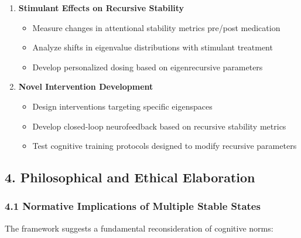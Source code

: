 \documentclass[
]{article}
\providecommand{\tightlist}{%
  \setlength{\itemsep}{0pt}\setlength{\parskip}{0pt}}
\begin{document}
\begin{enumerate}
\def\labelenumi{\arabic{enumi}.}
\tightlist
\item
  \textbf{Stimulant Effects on Recursive Stability}

  \begin{itemize}
  \tightlist
  \item
    Measure changes in attentional stability metrics pre/post medication
  \item
    Analyze shifts in eigenvalue distributions with stimulant treatment
  \item
    Develop personalized dosing based on eigenrecursive parameters
  \end{itemize}
\item
  \textbf{Novel Intervention Development}

  \begin{itemize}
  \tightlist
  \item
    Design interventions targeting specific eigenspaces
  \item
    Develop closed-loop neurofeedback based on recursive stability
    metrics
  \item
    Test cognitive training protocols designed to modify recursive
    parameters
  \end{itemize}
\end{enumerate}

\subsection{4. Philosophical and Ethical
Elaboration}\label{philosophical-and-ethical-elaboration}

\subsubsection{4.1 Normative Implications of Multiple Stable
States}\label{normative-implications-of-multiple-stable-states}

The framework suggests a fundamental reconsideration of cognitive norms:
\end{document}
